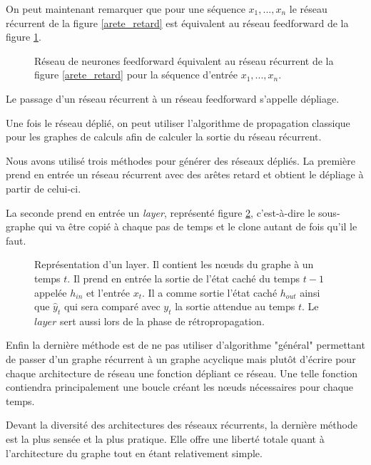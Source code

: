 On peut maintenant remarquer que pour une séquence $x_1, ..., x_n$ le réseau récurrent de la figure \ref{arete_retard} est équivalent au réseau feedforward de la figure \ref{reseau_deplie}.

\begin{figure}
\begin{center}

\caption{Réseau de neurones feedforward équivalent au réseau récurrent de la figure \ref{arete_retard} pour la séquence d'entrée $x_1, ..., x_n$.}
\label{reseau_deplie}
\end{center}
\end{figure}

Le passage d'un réseau récurrent à un réseau feedforward s'appelle dépliage.

Une fois le réseau déplié, on peut utiliser l'algorithme de propagation classique pour les graphes de calculs afin de calculer la sortie du réseau récurrent.

Nous avons utilisé trois méthodes pour générer des réseaux dépliés. La première prend en entrée un réseau récurrent avec des arêtes retard et obtient le dépliage à partir de celui-ci.

La seconde prend en entrée un \textit{layer}, représenté figure \ref{layer}, c'est-à-dire le sous-graphe qui va être copié à chaque pas de temps et le clone autant de fois qu'il le faut.

\begin{figure}
\begin{center}

\caption{Représentation d'un layer. Il contient les n\oe{}uds du graphe à un temps $t$. Il prend en entrée la sortie de l'état caché du temps $t-1$ appelée $h_{in}$ et l'entrée $x_t$. Il a comme sortie l'état caché $h_{out}$ ainsi que $\hat{y}_t$ qui sera comparé avec $y_t$ la sortie attendue au temps $t$. Le $layer$ sert aussi lors de la phase de rétropropagation.}
\label{layer}
\end{center}
\end{figure}

Enfin la dernière méthode est de ne pas utiliser d'algorithme "général" permettant de passer d'un graphe récurrent à un graphe acyclique mais plutôt d'écrire pour chaque architecture de réseau une fonction dépliant ce réseau. Une telle fonction contiendra principalement une boucle créant les n\oe{}uds nécessaires pour chaque temps.

Devant la diversité des architectures des réseaux récurrents, la dernière méthode est la plus sensée et la plus pratique. Elle offre une liberté totale quant à l'architecture du graphe tout en étant relativement simple.

